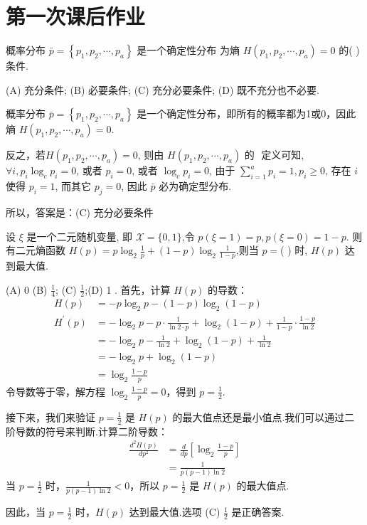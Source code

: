 
\section{第一次课后作业}

\begin{tcolorbox}[breakable,colback=blue!5!white,colframe=blue!75!black,
 title= 单选题]
  概率分布 $ \bar{p}=\left\{p_{1}, p_{2}, \cdots, p_{a}\right\} $ 是一个确定性分布 为熵 $ H\left(p_{1}, p_{2}, \cdots, p_{a}\right)=0 $ 的(  ) 条件.

    
(A) 充分条件;
(B) 必要条件;
(C) 充分必要条件;
(D) 既不充分也不必要.
 \tcblower

概率分布 $\bar{p}=\left\{p_{1}, p_{2}, \cdots, p_{a}\right\}$ 是一个确定性分布，即所有的概率都为1或0，因此熵 $H\left(p_{1}, p_{2}, \cdots, p_{a}\right)=0$.

反之，若$H\left(p_{1}, p_{2}, \cdots, p_{a}\right)=0 \text {, 则由 } H\left(p_{1}, p_{2}, \cdots, p_{a}\right) \text { 的 }
$
定义可知, $ \forall i, p_{i} \log _{c} p_{i}=0 $, 或者 $ p_{i}=0 $, 或者 $ \log _{c} p_{i}=0 $, 由于 $ \sum\limits_{i=1}^{a} p_{i}=1, p_{i} \geq 0 $, 存在 $ i $ 使得 $ p_{i}=1 $, 而其它 $ p_{j}=0 $, 因此 $ \bar{p} $ 必为确定型分布.

所以，答案是：(C) 充分必要条件


\end{tcolorbox}


\begin{tcolorbox}[breakable,colback=blue!5!white,colframe=blue!75!black,
 title= 单选题]
 设 $ \xi $ 是一个二元随机变量, 即 $ \mathscr{X}=\{0,1\} $,令 $ p(\xi=1)=p, p(\xi=0)=1-p $. 则有二元熵函数 $ H(p)=p \log _{2} \frac{1}{p}+(1-p) \log _{2} \frac{1}{1-p} $,则当 $ p=$(  ) 时, $ H(p) $ 达到最大值.

(A) $ 0  $ (B) $ \frac{1}{4} $;
(C) $ \frac{1}{2} $;(D) 1 .
  \tcblower
  首先，计算 $ H(p) $ 的导数：
$$
\begin{aligned}
H(p) & =-p \log_2 p-(1-p) \log_2 (1-p) \\
H^{\prime}(p) & =-\log_2 p-p \cdot \frac{1}{\ln 2 \cdot p}+\log_2 (1-p)+\frac{1}{1-p} \cdot \frac{1-p}{\ln 2} \\
& =-\log_2 p-\frac{1}{\ln 2}+\log_2 (1-p)+\frac{1}{\ln 2} \\
& =-\log_2 p+\log_2 (1-p) \\
& =\log_2 \frac{1-p}{p}
\end{aligned}
$$
令导数等于零，解方程 $ \log _{2} \frac{1-p}{p}=0 $，得到 $ p=\frac{1}{2} $.

接下来，我们来验证 $ p=\frac{1}{2} $ 是 $ H(p) $ 的最大值点还是最小值点.我们可以通过二阶导数的符号来判断.计算二阶导数：
$$
\begin{aligned}
\frac{d^{2} H(p)}{d p^{2}} &=\frac{d}{d p}\left[\log _{2} \frac{1-p}{p}\right] \\
&=\frac{1}{p(p-1)\ln 2}
\end{aligned}
$$
当 $ p=\frac{1}{2} $ 时，$ \frac{1}{p(p-1)\ln 2}<0 $，所以 $ p=\frac{1}{2} $ 是 $ H(p) $ 的最大值点.

因此，当 $ p=\frac{1}{2} $ 时，$ H(p) $ 达到最大值.选项 (C) $ \frac{1}{2} $ 是正确答案.
\end{tcolorbox}

